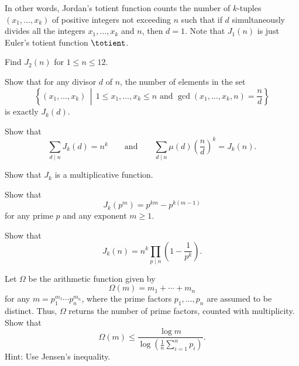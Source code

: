 \begin{challenge}
\begin{equation*}
  \end{equation*}
  In other words, Jordan's totient function counts the number of $k$-tuples $(x_1,\ldots,x_k)$ of positive integers not exceeding $n$ such that if $d$ simultaneously divides all the integers $x_1,\ldots,x_k$ and $n$, then $d=1$. Note that $J_1(n)$ is just Euler's totient function $\totient$.
  \begin{subexenum}
  \item Find $J_2(n)$ for $1\leq n\leq 12$.
  \item Show that for any divisor $d$ of $n$, the number of elements in the set
    \begin{equation*}
      \left\{(x_1,\ldots,x_k) \,\middle|\, 1\leq x_1,\ldots,x_k\leq n\text{ and }\gcd(x_1,\ldots,x_k,n)=\frac{n}{d}\right\}
    \end{equation*}
    is exactly $J_k(d)$.
  \item Show that
    \begin{equation*}
      \sum_{d\mid n}J_k(d) = n^k\qquad\text{and}\qquad \sum_{d\mid n}\mu(d)\left(\frac{n}{d}\right)^k = J_k(n).
    \end{equation*}
  \item Show that $J_k$ is a multiplicative function.
  \item Show that
    \begin{equation*}
      J_k(p^m) = p^{km}-p^{k(m-1)}
    \end{equation*}
    for any prime $p$ and any exponent $m\geq 1$.
  \item Show that
    \begin{equation*}
      J_k(n) = n^k\prod_{p\mid n}\left(1-\frac{1}{p^k}\right).
    \end{equation*}
  \end{subexenum}
  \exercise Let $\Omega$ be the arithmetic function given by
  \begin{equation*}
    \Omega(m)=m_1+\cdots+m_n
  \end{equation*}
  for any $m=p_1^{m_1}\cdots p_n^{m_n}$, where the prime factors $p_1,\ldots,p_n$ are assumed to be distinct. Thus, $\Omega$ returns the number of prime factors, counted with multiplicity. Show that
  \[
    \Omega(m)\leq
    \frac{\log m}{\log \left(\frac{1}{n}\sum_{i=1}^n p_i\right)}.
  \]
  Hint: Use Jensen's inequality.
\end{challenge}


